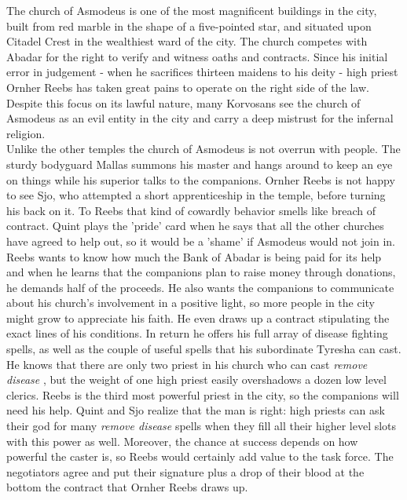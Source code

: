The church of Asmodeus is one of the most magnificent buildings in the city, built from red marble in the shape of a five-pointed star, and situated upon Citadel Crest in the wealthiest ward of the city. The church competes with Abadar for the right to verify and witness oaths and contracts. Since his initial error in judgement - when he sacrifices thirteen maidens to his deity - high priest Ornher Reebs has taken great pains to operate on the right side of the law. Despite this focus on its lawful nature, many Korvosans see the church of Asmodeus as an evil entity in the city and carry a deep mistrust for the infernal religion.\\

Unlike the other temples the church of Asmodeus is not overrun with people. The sturdy bodyguard Mallas summons his master and hangs around to keep an eye on things while his superior talks to the companions. Ornher Reebs is not happy to see Sjo, who attempted a short apprenticeship in the temple, before turning his back on it. To Reebs that kind of cowardly behavior smells like breach of contract. Quint plays the 'pride' card when he says that all the other churches have agreed to help out, so it would be a 'shame' if Asmodeus would not join in. Reebs wants to know how much the Bank of Abadar is being paid for its help and when he learns that the companions plan to raise money through donations, he demands half of the proceeds. He also wants the companions to communicate about his church's involvement in a positive light, so more people in the city might grow to appreciate his faith. He even draws up a contract stipulating the exact lines of his conditions. In return he offers his full array of disease fighting spells, as well as the couple of useful spells that his subordinate Tyresha can cast. He knows that there are only two priest in his church who can cast {\itshape remove disease} , but the weight of one high priest easily overshadows a dozen low level clerics. Reebs is the third most powerful priest in the city, so the companions will need his help. Quint and Sjo realize that the man is right: high priests can ask their god for many  {\itshape remove disease} spells when they fill all their higher level slots with this power as well. Moreover, the chance at success depends on how powerful the caster is, so Reebs would certainly add value to the task force. The negotiators agree and put their signature plus a drop of their blood at the bottom the contract that Ornher Reebs draws up. 